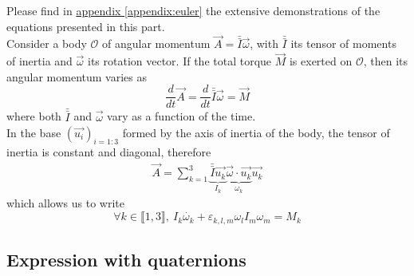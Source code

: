 \documentclass[class=report, float=false, crop=false]{standalone}
\begin{document}
Please find in \hyperref[appendix:euler]{appendix \ref{appendix:euler}} the extensive demonstrations of the equations presented in this part.\\

Consider a body $\mathcal{O}$ of angular momentum $\vec{A} = \bar{\bar{I}}\vec{\omega}$, with $\bar{\bar{I}}$ its tensor of moments of inertia and $\vec{\omega}$ its rotation vector. If the total torque $\vec{M}$ is exerted on $\mathcal{O}$, then its angular momentum varies as
\begin{equation}
\boxed{\frac{d}{dt}\vec{A} = \frac{d}{dt}\bar{\bar{I}}\vec{\omega} = \vec{M}}
\label{TMC_}
\end{equation}
where both $\bar{\bar{I}}$ and $\vec{\omega}$ vary as a function of the time.\\

In the base $(\vec{u_i})_{i=1:3}$ formed by the axis of inertia of the body, the tensor of inertia is constant and diagonal, therefore
\begin{align*}
\vec{A} = \sum_{k=1}^3 \underbrace{\bar{\bar{I}}\vec{u_k}}_{I_k} \underbrace{\vec{\omega}\cdot\vec{u_k}}_{\omega_k} \vec{u_k}
\end{align*}
which allows us to write
\begin{equation}
\boxed{\forall k \in \llbracket1,3\rrbracket,~ I_k \dot{\omega_k} + \varepsilon_{k,l,m}\omega_lI_m\omega_m = M_k}
\label{euler_rot_}
\end{equation}

\subsection{Expression with quaternions}
\end{document}
